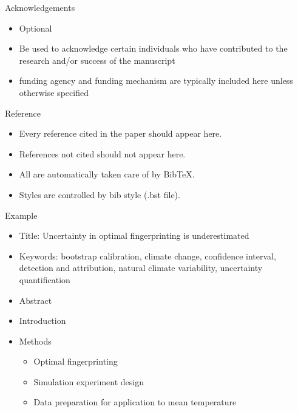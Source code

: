 \documentclass{beamer}
\begin{document}
    
    \begin{frame}{Acknowledgements}
    \begin{itemize}
        \item Optional
        \item Be used to acknowledge certain individuals who have contributed to the research and/or success of the manuscript
        \item funding agency and funding mechanism are typically included here unless otherwise specified
    \end{itemize}
    \end{frame}
    
    
    \begin{frame}{Reference}
    \begin{itemize}
        \item Every reference cited in the paper should appear here.
        \item References not cited should not appear here.
        \item All are automatically taken care of by BibTeX.
        \item Styles are controlled by bib style (.bst file).
    \end{itemize}
    \end{frame}
    
    
    \begin{frame}{Example}
    \begin{itemize}
        \item Title: Uncertainty in optimal fingerprinting is underestimated
        \item Keywords: bootstrap calibration, climate change, confidence interval, detection and attribution, natural climate variability,
    uncertainty quantification
        \item Abstract
        \item Introduction
        \item Methods
        \begin{itemize}
            \item Optimal fingerprinting
            \item Simulation experiment design
            \item Data preparation for application to mean
    temperature
        \end{itemize}
    \end{itemize} 
    \end{frame}
    
\end{document}
